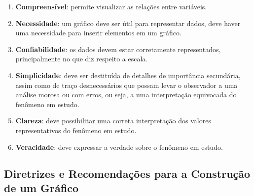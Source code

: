 \begin{enumerate}

\item \textbf{Compreensível}: permite visualizar as relações entre variáveis.
\item \textbf{Necessidade}: um gráfico deve ser útil para representar dados, deve haver uma necessidade para inserir elementos em um gráfico.
\item \textbf{Confiabilidade}: os dados devem estar corretamente representados, principalmente no que diz respeito a escala.
\item \textbf{Simplicidade}: deve ser destituída de detalhes de
importância secundária, assim como de traço desnecessários que
possam levar o observador a uma análise morosa ou com erros, ou
seja, a uma interpretação equivocada do fenômeno em estudo. \item
\textbf{Clareza}: deve possibilitar uma correta interpretação dos
valores representativos do fenômeno em estudo. \item
\textbf{Veracidade}: deve expressar a verdade sobre o fenômeno em
estudo.
\end{enumerate}


\newpage
\subsection{Diretrizes e Recomendações para a Construção de um Gráfico}

